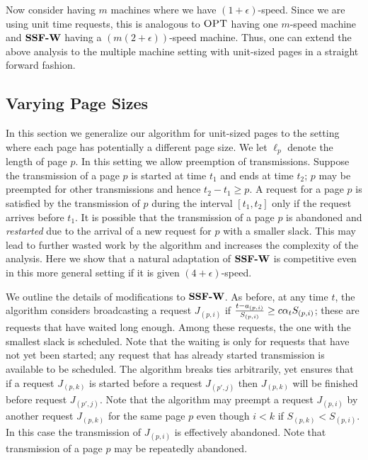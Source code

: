 \documentclass[11pt]{article}
\newtheorem{theorem}[lemma]{Theorem}
\newcommand{\opt}{\textrm{\sc OPT}}
\newcommand{\eps}{\epsilon}
\newcommand{\st}{S} \newcommand{\Algorithm}[1]{{\texttt{\bf{#1}}}} \newcommand{\sbg}{\Algorithm{SSF-W}} \newcommand{\sug}{\Algorithm{SSF}} \newcommand{\mmug}{\Algorithm{SSF-ID}}
\begin{document}
Now consider having $m$ machines where we have $(1+ \eps)$-speed.
Since we are using unit time requests, this is analogous to $\opt$
having one $m$-speed machine and $\sbg$ having a $(m(2 +
\eps))$-speed machine.  Thus, one can extend the above analysis to
the multiple machine setting with unit-sized pages in a
straight forward fashion.

\iffalse
\begin{theorem}
For some constant $\eps$, $\sbg$ is a $(2 + \eps)$-speed $O({1
\over {\eps^2}})$-competitive algorithm for minimizing the maximum
delay factor in broadcast scheduling with unit-time requests with
$m$ machines.
\end{theorem}
\fi

\subsection{Varying Page Sizes}
\label{subsec:varying}
In this section we generalize our algorithm for unit-sized pages to
the setting where each page has potentially a different page size. We
let $\ell_p$ denote the length of page $p$. In this setting we allow
preemption of transmissions. Suppose the transmission of a page $p$ is
started at time $t_1$ and ends at time $t_2$; $p$ may be preempted for
other transmissions and hence $t_2-t_1 \ge p$.  A request for a page
$p$ is satisfied by the transmission of $p$ during the interval $[t_1,
t_2]$ only if the request arrives before $t_1$. It is possible that
the transmission of a page $p$ is abandoned and {\em restarted} due to
the arrival of a new request for $p$ with a smaller slack.  This may
lead to further wasted work by the algorithm and increases the
complexity of the analysis. Here we show that a natural adaptation of
$\sbg$ is competitive even in this more general setting if it is given $(4 + \eps)$-speed.

We outline the details of modifications to $\sbg$. As before, at any time $t$, the algorithm considers broadcasting a
request $J_{(p,i)}$ if ${{t - a_{(p,i)}}\over{\st_{(p,i)}}} \geq c
\alpha_t \st_{(p,i)}$; these are requests that have waited long
enough.  Among these requests, the one with the smallest slack is
scheduled. Note that the waiting is only for requests that have not
yet been started; any request that has already started transmission is
available to be scheduled.  The algorithm breaks ties arbitrarily, yet
ensures that if a request $J_{(p,k)}$ is started before a request
$J_{(p',j)}$ then $J_{(p,k)}$ will be finished before request
$J_{(p',j)}$. Note that the algorithm may preempt a request
$J_{(p,i)}$ by another request $J_{(p,k)}$ for the same page $p$ even
though $i < k$ if $\st_{(p,k)} < \st_{(p,i)}$. In this case the
transmission of $J_{(p,i)}$ is effectively abandoned. Note that
transmission of a page $p$ may be repeatedly abandoned.
\end{document}
